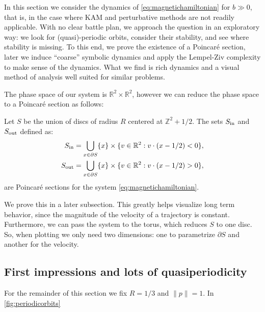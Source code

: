
In this section we consider the dynamics of \eqref{eq:magnetichamiltonian} for $b\gg 0$, that is, in the case where KAM and perturbative methods are not readily applicable. With no clear battle plan, we approach the question in an exploratory way: we look for (quasi)-periodic orbits, consider their stability, and see where stability is missing. To this end, we prove the existence of a Poincar\'e section, later we induce ``coarse'' symbolic dynamics and apply the Lempel-Ziv complexity to make sense of the dynamics. What we find is rich dynamics and a visual method of analysis well suited for similar problems.

The phase space of our system is $\mathbb R^2\times\mathbb R^2$, however we can reduce the phase space to a Poincar\'e section as follows:
\begin{proposition}
Let $S$ be the union of discs of radius $R$ centered at $\mathbb Z^2+1/2$. The sets $S_\text{in}$ and $S_\text{out}$ defined as:
\begin{align}
\label{def:poincaresectionIN}
S_\text{in} &= \bigcup_{x\in\partial S} \{x\} \times \{v\in\mathbb R^2 : v\cdot (x-1/2) < 0\},\\
\label{def:poincaresectionOUT}
S_\text{out} &= \bigcup_{x\in\partial S} \{x\} \times \{v\in\mathbb R^2 : v\cdot (x-1/2) > 0\},
\end{align}
are Poincar\'e sections for the system \eqref{eq:magnetichamiltonian}.
\end{proposition}
We prove this in a later subsection. This greatly helps visualize long term behavior, since the magnitude of the velocity of a trajectory is constant. Furthermore, we can pass the system to the torus, which reduces $S$ to one disc. So, when plotting we only need two dimensions: one to parametrize $\partial S$ and another for the velocity.

\subsection{First impressions and lots of quasiperiodicity}

For the remainder of this section we fix $R=1/3$ and $\|p\|=1$. In \ref{fig:periodicorbits}

